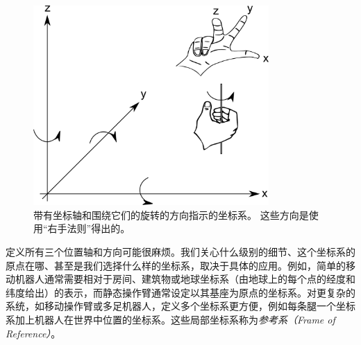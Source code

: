 \begin{figure}
	\centering
		\includegraphics[width=0.8\textwidth]{figs/coordinatesystem}
	\caption{带有坐标轴和围绕它们的旋转的方向指示的坐标系。 这些方向是使用“右手法则”得出的。}
	\label{fig:coordinatesystem}
\end{figure}


定义所有三个位置轴和方向可能很麻烦。我们关心什么级别的细节、这个坐标系的原点在哪、甚至是我们选择什么样的坐标系，取决于具体的应用。例如，简单的移动机器人通常需要相对于房间、建筑物或地球坐标系（由地球上的每个点的经度和纬度给出）的表示，而静态操作臂通常设定以其基座为原点的坐标系。对更复杂的系统，如移动操作臂或多足机器人，定义多个坐标系更方便，例如每条腿一个坐标系加上机器人在世界中位置的坐标系。这些局部坐标系称为\emph{参考系（Frame of Reference）}。

